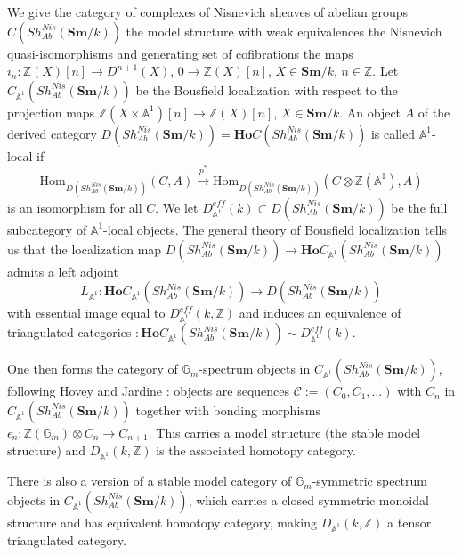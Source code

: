 \documentclass[a4paper,12pt,draft]{amsart}
\theoremstyle{definition}
\theoremstyle{remark}
\begin{document}
We give the category of complexes of Nisnevich sheaves of abelian groups $C(Sh_{Ab}^{Nis}({{\mathbf{Sm}}}/k))$ the  model structure with weak equivalences the Nisnevich quasi-isomorphisms and generating set of cofibrations the maps $i_n:{{\mathbb Z}}(X)[n]\to D^{n+1}(X)$, $0\to {{\mathbb Z}}(X)[n]$,  $X\in {{\mathbf{Sm}}}/k$, $n\in {{\mathbb Z}}$.    Let $C_{{{\mathbb A}}^1}(Sh_{Ab}^{Nis}({{\mathbf{Sm}}}/k))$ be the Bousfield localization with respect to the projection maps ${{\mathbb Z}}(X\times{{\mathbb A}}^1)[n]\to {{\mathbb Z}}(X)[n]$, $X\in {{\mathbf{Sm}}}/k$. An object $A$ of the derived category $D(Sh_{Ab}^{Nis}({{\mathbf{Sm}}}/k))={{\mathbf{Ho}}} C(Sh_{Ab}^{Nis}({{\mathbf{Sm}}}/k))$ is called ${{\mathbb A}}^1$-local if 
\[
{\text{Hom}}_{D(Sh_{Ab}^{Nis}({{\mathbf{Sm}}}/k))}(C, A)\xrightarrow{p^*}{\text{Hom}}_{D(Sh_{Ab}^{Nis}({{\mathbf{Sm}}}/k))}(C\otimes{{\mathbb Z}}({{\mathbb A}}^1), A)
\]
is an isomorphism for all $C$. We let $D_{{{\mathbb A}}^1}^{eff}(k)\subset D(Sh_{Ab}^{Nis}({{\mathbf{Sm}}}/k))$ be the full subcategory of ${{\mathbb A}}^1$-local objects. The general theory of Bousfield localization tells us that the localization map $D(Sh_{Ab}^{Nis}({{\mathbf{Sm}}}/k))\to {{\mathbf{Ho}}} C_{{{\mathbb A}}^1}(Sh_{Ab}^{Nis}({{\mathbf{Sm}}}/k))$ admits a left adjoint 
\[
L_{{{\mathbb A}}^1}:{{\mathbf{Ho}}} C_{{{\mathbb A}}^1}(Sh_{Ab}^{Nis}({{\mathbf{Sm}}}/k))\to D(Sh_{Ab}^{Nis}({{\mathbf{Sm}}}/k))
\]
with essential image equal to $D_{{{\mathbb A}}^1}^{eff}(k,{{\mathbb Z}})$ and induces an equivalence of triangulated categories $:{{\mathbf{Ho}}} C_{{{\mathbb A}}^1}(Sh_{Ab}^{Nis}({{\mathbf{Sm}}}/k))\sim D_{{{\mathbb A}}^1}^{eff}(k)$.

One then forms the category of ${{\mathbb G}}_m$-spectrum objects in $C_{{{\mathbb A}}^1}(Sh_{Ab}^{Nis}({{\mathbf{Sm}}}/k))$, following Hovey \cite{Hovey} and Jardine \cite{Jardine00}: objects are sequences ${{\mathcal C}}:=(C_0, C_1,\ldots)$ with $C_n$ in $C_{{{\mathbb A}}^1}(Sh_{Ab}^{Nis}({{\mathbf{Sm}}}/k))$ together with bonding morphisms $\epsilon_n:{{\mathbb Z}}({{\mathbb G}}_m)\otimes C_n\to C_{n+1}$. This carries a model structure (the stable model structure) and $D_{{{\mathbb A}}^1}(k,{{\mathbb Z}})$ is the associated homotopy category.

There is also a version of a stable model category of ${{\mathbb G}}_m$-symmetric spectrum objects in $C_{{{\mathbb A}}^1}(Sh_{Ab}^{Nis}({{\mathbf{Sm}}}/k))$, which carries a closed symmetric monoidal structure and has equivalent homotopy category, making $D_{{{\mathbb A}}^1}(k,{{\mathbb Z}})$ a tensor triangulated category.
\end{document}
